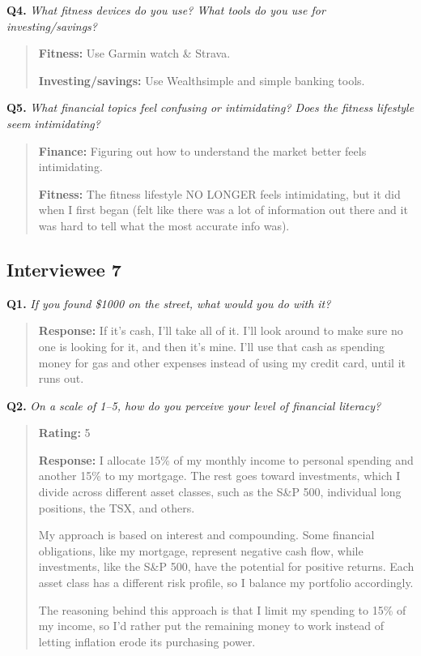 \documentclass[12pt]{article}
\begin{document}
\medskip
\noindent\textbf{Q4.} \textit{What fitness devices do you use? What tools do you use for investing/savings?}

\begin{quote}
\textbf{Fitness:} Use Garmin watch \& Strava.\par
\textbf{Investing/savings:} Use Wealthsimple and simple banking tools.\par
\end{quote}

\medskip
\noindent\textbf{Q5.} \textit{What financial topics feel confusing or intimidating? Does the fitness lifestyle seem intimidating?}

\begin{quote}
\textbf{Finance:} Figuring out how to understand the market better feels intimidating.\par
\textbf{Fitness:} The fitness lifestyle NO LONGER feels intimidating, but it did when I first began (felt like there was a lot of information out there and it was hard to tell what the most accurate info was).\par
\end{quote}

\subsection{Interviewee 7}

\medskip
\noindent\textbf{Q1.} \textit{If you found \$1000 on the street, what would you do with it?}

\begin{quote}
\textbf{Response:} If it's cash, I'll take all of it. I'll look around to make sure no one is looking for it, and then it's mine. I'll use that cash as spending money for gas and other expenses instead of using my credit card, until it runs out.\par
\end{quote}

\medskip
\noindent\textbf{Q2.} \textit{On a scale of 1--5, how do you perceive your level of financial literacy?}

\begin{quote}
\textbf{Rating:} 5\par
\textbf{Response:} I allocate 15\% of my monthly income to personal spending and another 15\% to my mortgage. The rest goes toward investments, which I divide across different asset classes, such as the S\&P 500, individual long positions, the TSX, and others.\par
My approach is based on interest and compounding. Some financial obligations, like my mortgage, represent negative cash flow, while investments, like the S\&P 500, have the potential for positive returns. Each asset class has a different risk profile, so I balance my portfolio accordingly.\par
The reasoning behind this approach is that I limit my spending to 15\% of my income, so I'd rather put the remaining money to work instead of letting inflation erode its purchasing power.\par
\end{quote}
\end{document}
